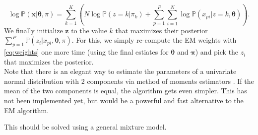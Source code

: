 \documentclass[a4paper,11pt]{article}
\def\x{\boldsymbol{x}}
\def\z{\boldsymbol{z}}
\def\bpi{\boldsymbol{\pi}}
\def\btheta{\boldsymbol{\theta}}
\def\p{\mathbb{P}}
\begin{document}
\begin{equation*}
 \log \p(\x | \btheta, \pi) = \sum_{k=1}^K \left( N \log \p(z = k| \pi_k) + \sum_{p=1}^P\sum_{i=1}^N \log \p(x_{pi}|z = k, \btheta) \right).
\end{equation*}
We finally initialize $\z$ to the value $k$ that maximizes their posterior $\sum_{p=1}^P\p(z_i | x_{pi}, \btheta, \pi)$. For this, we simply re-compute the EM weights with \eqref{eq:weights} one more time (using the final estiates for $\btheta$ and $\bpi$) and pick the $z_i$ that maximizes the posterior.\\
Note that there is an elegant way to estimate the parameters of a univariate normal distribution with 2 components via method of moments estimators \citep{Cohen1967}. If the mean of the two components is equal, the algorithm gets even simpler. This has not been implemented yet, but would be a powerful and fast alternative to the EM algorithm.

This should be solved using a general mixture model.
\end{document}
